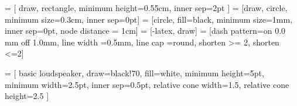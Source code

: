 

 = [
  draw, 
  rectangle, 
  minimum height=0.55cm, 
  inner sep=2pt
]
 = [draw, circle, minimum size=0.3cm, inner sep=0pt]
 = [circle, fill=black, minimum size=1mm, inner sep=0pt, node 
distance = 1cm]
 = [-latex, draw]
= [dash pattern=on 0.0 mm off 1.0mm, line width 
=0.5mm, line cap =round, shorten >= 2, shorten <=2]

 = [
  basic loudspeaker, 
  draw=black!70, 
  fill=white, 
  minimum height=5pt,
  minimum width=2.5pt,
  inner sep=0.5pt,
  relative cone width=1.5,
  relative cone height=2.5
]

